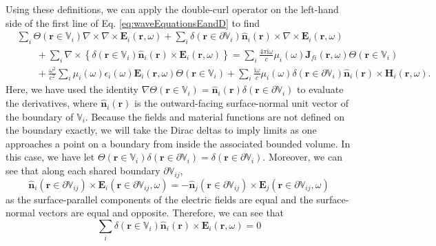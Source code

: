 Using these definitions, we can apply the double-curl operator on the left-hand side of the first line of Eq. \eqref{eq:waveEquationsEandD} to find
\begin{equation}\label{eq:waveEqEseparated}
\begin{split}
&\sum_i\Theta(\mathbf{r}\in\mathbb{V}_i)\nabla\times\nabla\times\mathbf{E}_i(\mathbf{r},\omega) + \sum_i\delta(\mathbf{r}\in\partial\mathbb{V}_i)\hat{\mathbf{n}}_i(\mathbf{r})\times\nabla\times\mathbf{E}_i(\mathbf{r},\omega)\\
&\qquad + \sum_i\nabla\times\left\{\delta(\mathbf{r}\in\mathbb{V}_i)\hat{\mathbf{n}}_i(\mathbf{r})\times\mathbf{E}_i(\mathbf{r},\omega)\right\} = \sum_i\frac{4\pi\mathrm{i}\omega}{c}\mu_i(\omega)\mathbf{J}_{fi}(\mathbf{r},\omega)\Theta(\mathbf{r}\in\mathbb{V}_i)\\
&\qquad + \frac{\omega^2}{c^2}\sum_i\mu_i(\omega)\epsilon_i(\omega)\mathbf{E}_i(\mathbf{r},\omega)\Theta(\mathbf{r}\in\mathbb{V}_i) + \sum_i\frac{\mathrm{i}\omega}{c}\mu_i(\omega)\delta(\mathbf{r}\in\partial\mathbb{V}_i)\hat{\mathbf{n}}_i(\mathbf{r})\times\mathbf{H}_i(\mathbf{r},\omega).
\end{split}
\end{equation}
Here, we have used the identity $\nabla\Theta(\mathbf{r}\in\mathbb{V}_i) = \hat{\mathbf{n}}_i(\mathbf{r})\delta(\mathbf{r}\in\partial\mathbb{V}_i)$ to evaluate the derivatives, where $\hat{\mathbf{n}}_i(\mathbf{r})$ is the outward-facing surface-normal unit vector of the boundary of $\mathbb{V}_i$. Because the fields and material functions are not defined on the boundary exactly, we will take the Dirac deltas to imply limits as one approaches a point on a boundary from inside the associated bounded volume. In this case, we have let $\Theta(\mathbf{r}\in\mathbb{V}_i)\delta(\mathbf{r}\in\partial\mathbb{V}_i) = \delta(\mathbf{r}\in\partial\mathbb{V}_i)$. Moreover, we can see that along each shared boundary $\partial\mathbb{V}_{ij}$,
\begin{equation}
\hat{\mathbf{n}}_i(\mathbf{r}\in\partial\mathbb{V}_{ij})\times\mathbf{E}_i(\mathbf{r}\in\partial\mathbb{V}_{ij},\omega) = -\hat{\mathbf{n}}_j(\mathbf{r}\in\partial\mathbb{V}_{ij})\times\mathbf{E}_j(\mathbf{r}\in\partial\mathbb{V}_{ij},\omega)
\end{equation}
as the surface-parallel components of the electric fields are equal and the surface-normal vectors are equal and opposite. Therefore, we can see that
\begin{equation}
\sum_i\delta(\mathbf{r}\in\mathbb{V}_i)\hat{\mathbf{n}}_i(\mathbf{r})\times\mathbf{E}_i(\mathbf{r},\omega) = 0
\end{equation}
